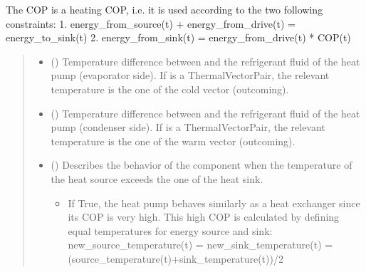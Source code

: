 \documentclass[letterpaper,10pt,english]{sphinxmanual}
\begin{document}
\begin{fulllineitems}
\begin{fulllineitems}
\sphinxAtStartPar
The COP is a heating COP, i.e. it is used according to the two following constraints:
1. energy\_from\_source(t) + energy\_from\_drive(t) = energy\_to\_sink(t)
2. energy\_from\_sink(t) = energy\_from\_drive(t) * COP(t)
\begin{quote}\begin{description}
\begin{itemize}
\item {} 
\sphinxAtStartPar
{} (\sphinxstyleliteralemphasis{\sphinxupquote{, }}) \textendash{} Temperature difference between  and the refrigerant fluid of the heat pump (evaporator side).
If  is a ThermalVectorPair, the relevant temperature is the one of the cold vector (outcoming).

\item {} 
\sphinxAtStartPar
{} (\sphinxstyleliteralemphasis{\sphinxupquote{, }}) \textendash{} Temperature difference between  and the refrigerant fluid of the heat pump (condenser side).
If  is a ThermalVectorPair, the relevant temperature is the one of the warm vector (outcoming).

\item {} 
\sphinxAtStartPar
{} (\sphinxstyleliteralemphasis{\sphinxupquote{, }}\sphinxstyleliteralemphasis{\sphinxupquote{, }}) \textendash{} 
\sphinxAtStartPar
Describes the behavior of the component when the temperature of the heat source exceeds the one of the heat sink.
\begin{itemize}
\item {} 
\sphinxAtStartPar
If True, the heat pump behaves similarly as a heat exchanger since its COP is very high.
This high COP is calculated by defining equal temperatures for energy source and sink:
new\_source\_temperature(t) = new\_sink\_temperature(t) = (source\_temperature(t)+sink\_temperature(t))/2


\end{itemize}
\end{itemize}
\end{description}
\end{quote}
\end{fulllineitems}
\end{fulllineitems}
\end{document}
